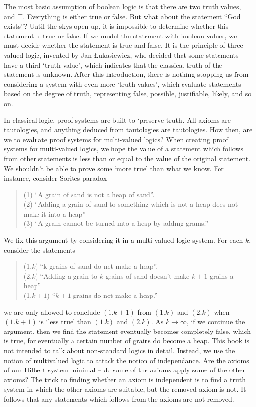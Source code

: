 The most basic assumption of boolean logic is that there are two truth values, $\bot$ and $\top$. Everything is either true or false. But what about the statement ``God exists''? Until the skys open up, it is impossible to determine whether this statement is true or false. If we model the statement with boolean values, we must decide whether the statement is true and false. It is the principle of three-valued logic, invented by Jan \L ukasiewicz, who decided that some statements have a third `truth value', which indicates that the classical truth of the statement is unknown. After this introduction, there is nothing stopping us from considering a system with even more `truth values', which evaluate statements based on the degree of truth, representing false, possible, justifiable, likely, and so on.

In classical logic, proof systems are built to `preserve truth'. All axioms are tautologies, and anything deduced from tautologies are tautologies. How then, are we to evaluate proof systems for multi-valued logics? When creating proof systems for multi-valued logics, we hope the value of a statement which follows from other statements is less than or equal to the value of the original statement. We shouldn't be able to prove some `more true' than what we know. For instance, consider Sorites paradox
%
\begin{quote}
    (1) ``A grain of sand is not a heap of sand''.\\
    (2) ``Adding a grain of sand to something which is not a heap does not make it into a heap''\\
    (3) ``A grain cannot be turned into a heap by adding grains.''
\end{quote}
%
We fix this argument by considering it in a multi-valued logic system. For each $k$, consider the statements
%
\begin{quote}
    (1.$k$) ``k grains of sand do not make a heap''.\\
    (2.$k$) ``Adding a grain to $k$ grains of sand doesn't make $k+1$ grains a heap''\\
    (1.$k+1$) ``$k+1$ grains do not make a heap.''
\end{quote}
%
we are only allowed to conclude $(1.k+1)$ from $(1.k)$ and $(2.k)$ when $(1.k+1)$ is `less true' than $(1.k)$ and $(2.k)$. As $k \to \infty$, if we continue the argument, then we find the statement eventually becomes completely false, which is true, for eventually a certain number of grains do become a heap. This book is not intended to talk about non-standard logics in detail. Instead, we use the notion of multivalued logic to attack the notion of independance. Are the axioms of our Hilbert system minimal -- do some of the axioms apply some of the other axioms? The trick to finding whether an axiom is independent is to find a truth system in which the other axioms are suitable, but the removed axiom is not. It follows that any statements which follows from the axioms are not removed.

